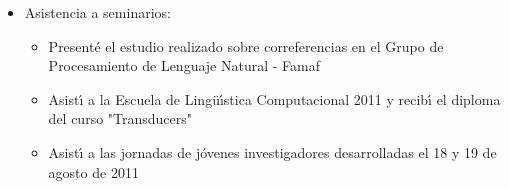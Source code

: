 \begin{itemize}
\begin{itemize}
\item Curs\'e la materia {\bf Generaci\'on de Lenguaje Natural} (primer cuatrimestre de 2011)\\
En esta materia estoy realizando un surface realizer para el espa\~{n}ol, un surface realizer es un m\'odulo de generaci\'on de lenguaje natural que toma informaci\'on sem\'antica y retorna texto en lenguaje natural que corresponde a la sem\'antica dada. El libro principal de la materia fue \cite{Reiter2000}\\
\end{itemize}
\item Asistencia a seminarios:\\
\begin{itemize}
\item Present\'e el estudio realizado sobre correferencias en el Grupo de Procesamiento de Lenguaje Natural - Famaf\\
\item Asist\'{\i} a la Escuela de Ling\"u\'{\i}stica Computacional 2011 y recib\'{\i} el diploma del curso "Transducers"\\
\item Asist\'{\i} a las jornadas de j\'ovenes investigadores desarrolladas el 18 y 19 de agosto de 2011
\end{itemize}
\end{itemize}
